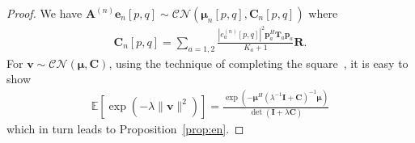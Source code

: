 \documentclass[journal]{IEEEtran}
\begin{document}
\begin{proof}
  We have $\mathbf{A}^{(n)}\mathbf{e}_n[p,q]
  \sim\mathcal{CN}(\bm{\mu}_n[p,q], \mathbf{C}_n[p,q])$
  where 
  \begin{align}
    \mathbf{C}_n[p,q] = \sum_{a=1,2}
    \frac{|e_a^{(n)}[p,q]|^2\mathbf{p}_a^H\mathbf{T}_a
    \mathbf{p}_a}{K_a+1}\mathbf{R}.
  \end{align}
  For $\mathbf{v}\sim\mathcal{CN}(\bm{\mu}, \mathbf{C})$, using the technique of
  completing the square~\cite[Sec. 2.3.1]{bishop2006pattern}, it is easy to show
  \begin{align}
    \mathbb{E}\left[\exp(-\lambda\|\mathbf{v}\|^2)\right] =
    \frac{\exp\left(-\bm{\mu}^H(\lambda^{-1}\mathbf{I} +
    \mathbf{C})^{-1}\bm{\mu}\right)}{\det(\mathbf{I} +
    \lambda\mathbf{C})} \label{eq:elv2}
  \end{align}
  which in turn leads to Proposition~\ref{prop:en}.
\end{proof}
\end{document}
